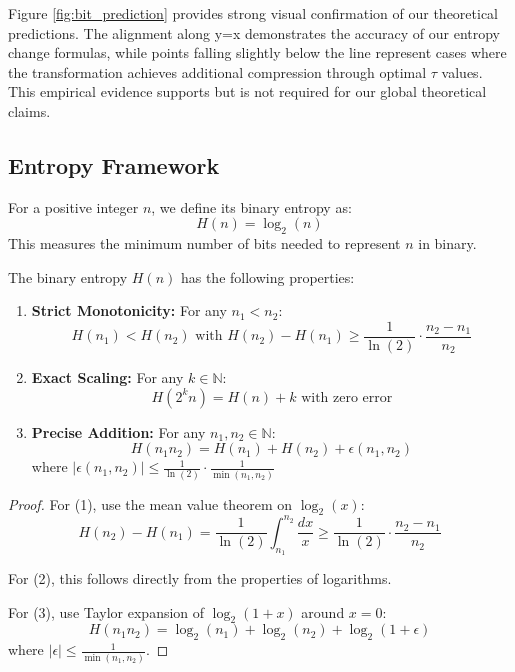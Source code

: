 Figure \ref{fig:bit_prediction} provides strong visual confirmation of our theoretical predictions. The alignment along y=x demonstrates the accuracy of our entropy change formulas, while points falling slightly below the line represent cases where the transformation achieves additional compression through optimal $\tau$ values. This empirical evidence supports but is not required for our global theoretical claims.

\subsection{Entropy Framework}

\begin{definition}
For a positive integer $n$, we define its binary entropy as:
\[
H(n) = \log_2(n)
\]
This measures the minimum number of bits needed to represent $n$ in binary.
\end{definition}

\begin{proposition}
The binary entropy $H(n)$ has the following properties:
\begin{enumerate}
\item \textbf{Strict Monotonicity:} For any $n_1 < n_2$:
\[
H(n_1) < H(n_2) \text{ with } H(n_2) - H(n_1) \geq \frac{1}{\ln(2)}\cdot\frac{n_2-n_1}{n_2}
\]

\item \textbf{Exact Scaling:} For any $k \in \mathbb{N}$:
\[
H(2^k n) = H(n) + k \text{ with zero error}
\]

\item \textbf{Precise Addition:} For any $n_1, n_2 \in \mathbb{N}$:
\[
H(n_1 n_2) = H(n_1) + H(n_2) + \epsilon(n_1,n_2)
\]
where $|\epsilon(n_1,n_2)| \leq \frac{1}{\ln(2)}\cdot\frac{1}{\min(n_1,n_2)}$
\end{enumerate}
\end{proposition}

\begin{proof}
For (1), use the mean value theorem on $\log_2(x)$:
\[
H(n_2) - H(n_1) = \frac{1}{\ln(2)}\int_{n_1}^{n_2}\frac{dx}{x} \geq \frac{1}{\ln(2)}\cdot\frac{n_2-n_1}{n_2}
\]

For (2), this follows directly from the properties of logarithms.

For (3), use Taylor expansion of $\log_2(1 + x)$ around $x = 0$:
\[
H(n_1 n_2) = \log_2(n_1) + \log_2(n_2) + \log_2(1 + \epsilon)
\]
where $|\epsilon| \leq \frac{1}{\min(n_1,n_2)}$.
\end{proof}

